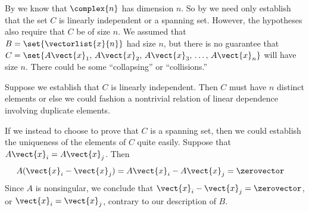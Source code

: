 By  we know that $\complex{n}$ has dimension $n$.  So by  we need only establish that the set $C$ is linearly independent or a spanning set.  However, the hypotheses also require that $C$ be of size $n$.  We assumed that $B=\set{\vectorlist{x}{n}}$ had size $n$, but there is no guarantee that $C=\set{A\vect{x}_1,\,A\vect{x}_2,\,A\vect{x}_3,\,\dots,\,A\vect{x}_n}$ will have size $n$.  There could be some ``collapsing'' or ``collisions.''\par
%
Suppose we establish that $C$ is linearly independent.  Then $C$ must have $n$ distinct elements or else we could fashion a nontrivial relation of linear dependence involving duplicate elements.\par
%
If we instead to choose to prove that $C$ is a spanning set, then we could establish the uniqueness of the elements of $C$ quite easily.  Suppose that $A\vect{x}_i=A\vect{x}_j$.  Then
%
\begin{align*}
A(\vect{x}_i-\vect{x}_j)&=A\vect{x}_i - A\vect{x}_j=\zerovector
\end{align*}
%
Since $A$ is nonsingular, we conclude that $\vect{x}_i-\vect{x}_j=\zerovector$, or $\vect{x}_i=\vect{x}_j$, contrary to our description of $B$.